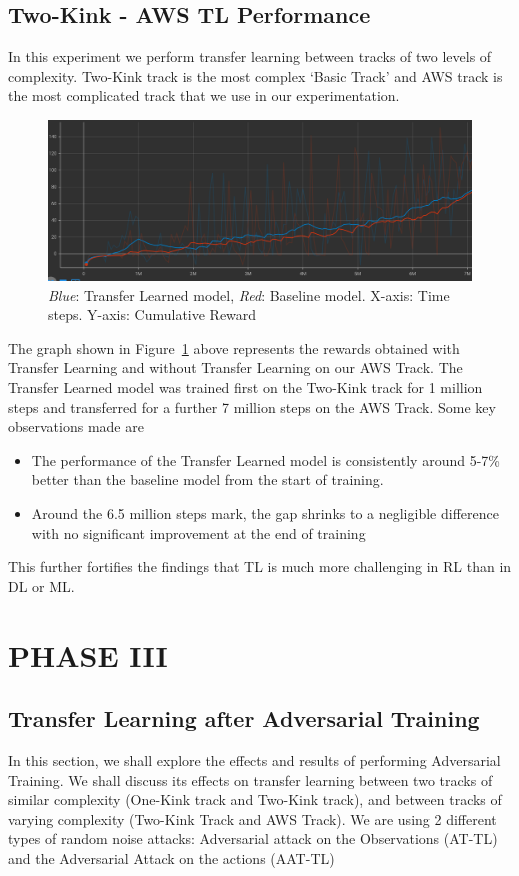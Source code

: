 \subsection{Two-Kink - AWS TL Performance}
In this experiment we perform transfer learning between tracks of two
levels of complexity. Two-Kink track is the most complex `Basic Track'
and AWS track is the most complicated track that we use in our
experimentation.
\begin{figure}[H]
  \centering
  \includegraphics[width=1.0\textwidth]{images/graphs/TL-TwoKink-AWS.png}
  \caption{\textit{Blue}: Transfer Learned model, \textit{Red}:
    Baseline model. X-axis: Time steps. Y-axis: Cumulative Reward}
  \label{TL-TwoKink-AWS}
\end{figure}

The graph shown in Figure~\ref{TL-TwoKink-AWS} above represents the
rewards obtained with Transfer Learning and without Transfer Learning
on our AWS Track. The Transfer Learned model was trained first on the
Two-Kink track for 1 million steps and transferred for a further 7
million steps on the AWS Track. Some key observations made are
\begin{itemize}
\item The performance of the Transfer Learned model is consistently
  around 5-7\% better than the baseline model from the start of
  training.
\item Around the 6.5 million steps mark, the gap shrinks to a
  negligible difference with no significant improvement at the end of
  training
\end{itemize}
This further fortifies the findings that TL is much more challenging
in RL than in DL or ML.


\section{PHASE III}

\subsection{Transfer Learning after Adversarial Training }
In this section, we shall explore the effects and results of
performing Adversarial Training. We shall discuss its effects on
transfer learning between two tracks of similar complexity (One-Kink
track and Two-Kink track), and between tracks of varying complexity
(Two-Kink Track and AWS Track).  We are using 2 different types of
random noise attacks: Adversarial attack on the Observations (AT-TL)
and the Adversarial Attack on the actions (AAT-TL)

